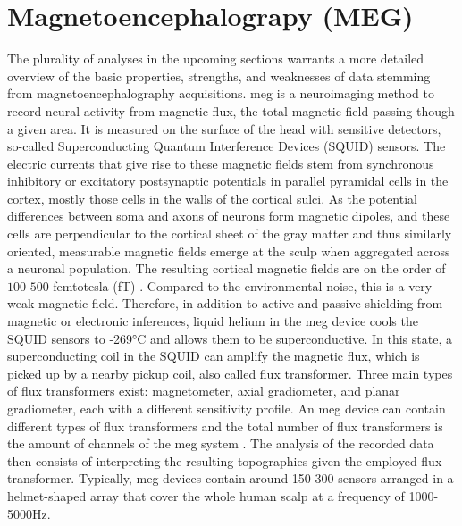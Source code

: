 

\section{Magnetoencephalograpy (MEG)}

The plurality of analyses in the upcoming sections warrants a more detailed overview of the basic properties, strengths, and weaknesses of data stemming from magnetoencephalography acquisitions.
\gls{meg} is a neuroimaging method to record neural activity from magnetic flux, the total magnetic field passing though a given area.
It is measured on the surface of the head with sensitive detectors, so-called Superconducting Quantum Interference Devices (SQUID) sensors.
The electric currents that give rise to these magnetic fields stem from synchronous inhibitory or excitatory postsynaptic potentials in parallel pyramidal cells in the cortex, mostly those cells in the walls of the cortical sulci.
As the potential differences between soma and axons of neurons form magnetic dipoles, and these cells are perpendicular to the cortical sheet of the gray matter and thus similarly oriented, measurable magnetic fields emerge at the sculp when aggregated across a neuronal population.
The resulting cortical magnetic fields are on the order of $100$-$500$ femtotesla (fT) \citep{hari2017primer}.
Compared to the environmental noise, this is a very weak magnetic field.
Therefore, in addition to active and passive shielding from magnetic or electronic inferences, liquid helium in the \gls{meg} device cools the SQUID sensors to -269°C and allows them to be superconductive.
In this state, a superconducting coil in the SQUID can amplify the magnetic flux, which is picked up by a nearby pickup coil, also called flux transformer.
Three main types of flux transformers exist: magnetometer, axial gradiometer, and planar gradiometer, each with a different sensitivity profile.
An \gls{meg} device can contain different types of flux transformers and the total number of flux transformers is the amount of channels of the \gls{meg} system \citep{puce2017review}.
The analysis of the recorded data then consists of interpreting the resulting topographies given the employed flux transformer.
Typically, \gls{meg} devices contain around 150-300 sensors arranged in a helmet-shaped array that cover the whole human scalp at a frequency of 1000-5000Hz.
